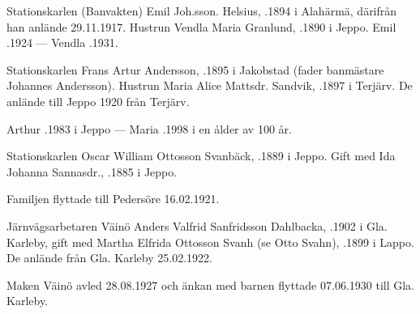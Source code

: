 Stationskarlen (Banvakten) Emil Joh.sson. Helsius, .1894 i Alahärmä, därifrån han anlände 29.11.1917. Hustrun Vendla Maria Granlund, .1890 i Jeppo.
Emil .1924  ---  Vendla .1931.


Stationskarlen Frans Artur Andersson, .1895 i Jakobstad (fader banmästare Johannes Andersson). Hustrun Maria Alice Mattsdr. Sandvik, .1897 i Terjärv. De anlände till Jeppo 1920 från Terjärv.
\begin{jhchildren}
  \item {}
  \item {}
\end{jhchildren}
Arthur .1983 i Jeppo  ---  Maria .1998 i en ålder av 100 år.


Stationskarlen Oscar William Ottosson Svanbäck, .1889 i Jeppo. Gift med Ida Johanna Sannasdr., .1885 i Jeppo.
\begin{jhchildren}
  \item {}
  \item {}
  \item {}
  \item {}
  \item {}
  \item {}
  \item {}
\end{jhchildren}
Familjen flyttade till Pedersöre 16.02.1921.


Järnvägsarbetaren Väinö Anders Valfrid Sanfridsson Dahlbacka, .1902 i Gla. Karleby, gift med Martha Elfrida Ottosson Svanh (se Otto Svahn), .1899 i Lappo. De anlände från Gla. Karleby 25.02.1922.
\begin{jhchildren}
  \item {}
  \item {}
  \item {}
\end{jhchildren}
Maken Väinö avled 28.08.1927 och änkan med barnen flyttade 07.06.1930 till Gla. Karleby.



